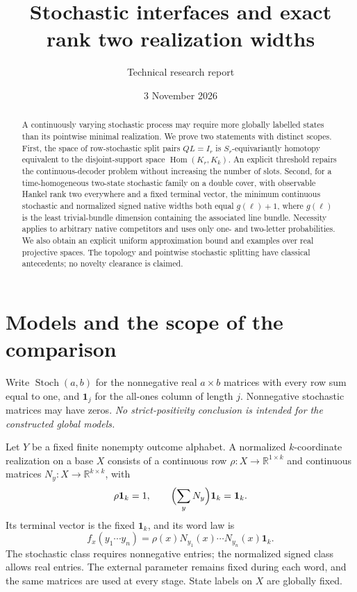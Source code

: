 \documentclass[11pt]{article}
\title{Stochastic interfaces and exact rank two realization widths}
\author{Technical research report}
\date{3 November 2026}
\theoremstyle{definition}
\newcommand{\R}{\mathbb R}
\newcommand{\one}{\mathbf 1}
\newcommand{\St}{\operatorname{Stoch}}
\newcommand{\Hom}{\operatorname{Hom}}
\begin{document}
\maketitle
\begin{abstract}
A continuously varying stochastic process may require more globally labelled states than its pointwise minimal realization. We prove two statements with distinct scopes. First, the space of row-stochastic split pairs $QL=I_r$ is $S_r$-equivariantly homotopy equivalent to the disjoint-support space $\Hom(K_r,K_k)$. An explicit threshold repairs the continuous-decoder problem without increasing the number of slots. Second, for a time-homogeneous two-state stochastic family on a double cover, with observable Hankel rank two everywhere and a fixed terminal vector, the minimum continuous stochastic and normalized signed native widths both equal $g(\ell)+1$, where $g(\ell)$ is the least trivial-bundle dimension containing the associated line bundle. Necessity applies to arbitrary native competitors and uses only one- and two-letter probabilities. We also obtain an explicit uniform approximation bound and examples over real projective spaces. The topology and pointwise stochastic splitting have classical antecedents; no novelty clearance is claimed.
\end{abstract}
\tableofcontents

\section{Models and the scope of the comparison}
Write $\St(a,b)$ for the nonnegative real $a\times b$ matrices with every row sum equal to one, and $\one_j$ for the all-ones column of length $j$. Nonnegative stochastic matrices may have zeros. \emph{No strict-positivity conclusion is intended for the constructed global models.}

Let $Y$ be a fixed finite nonempty outcome alphabet. A normalized $k$-coordinate realization on a base $X$ consists of a continuous row $\rho:X\to\R^{1\times k}$ and continuous matrices $N_y:X\to\R^{k\times k}$, with
\[
 \rho\one_k=1,\qquad \Bigl(\sum_yN_y\Bigr)\one_k=\one_k.
\]
Its terminal vector is the fixed $\one_k$, and its word law is
\[
 f_x(y_1\cdots y_n)=\rho(x)N_{y_1}(x)\cdots N_{y_n}(x)\one_k.
\]
The stochastic class requires nonnegative entries; the normalized signed class allows real entries. The external parameter remains fixed during each word, and the same matrices are used at every stage. State labels on $X$ are globally fixed.
\end{document}
